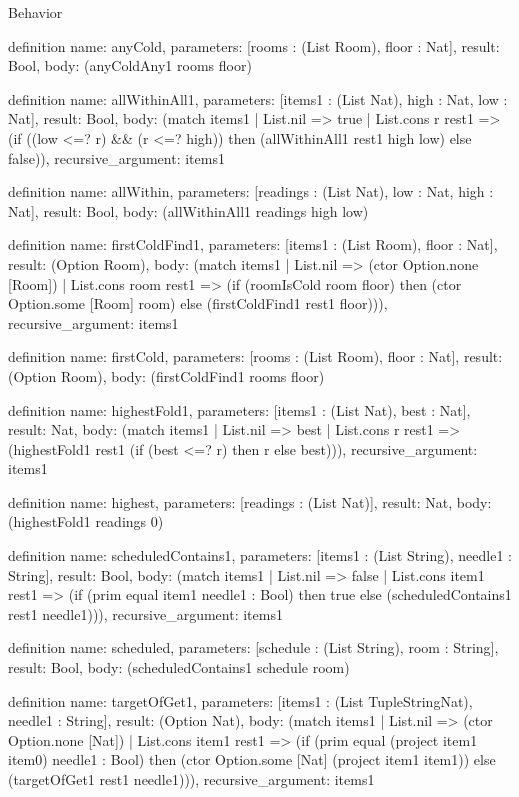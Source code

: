 \begin{lexlean}{Behavior}
\begin{semanticmodule}
definition{
  name: anyCold,
  parameters: [rooms : (List Room), floor : Nat],
  result: Bool,
  body: (anyColdAny1 rooms floor)
}

definition{
  name: allWithinAll1,
  parameters: [items1 : (List Nat), high : Nat, low : Nat],
  result: Bool,
  body: (match items1
    | List.nil => true
    | List.cons r rest1 => (if ((low <=? r) && (r <=? high)) then (allWithinAll1 rest1 high low) else false)),
  recursive_argument: items1
}

definition{
  name: allWithin,
  parameters: [readings : (List Nat), low : Nat, high : Nat],
  result: Bool,
  body: (allWithinAll1 readings high low)
}

definition{
  name: firstColdFind1,
  parameters: [items1 : (List Room), floor : Nat],
  result: (Option Room),
  body: (match items1
    | List.nil => (ctor Option.none [Room])
    | List.cons room rest1 => (if (roomIsCold room floor) then (ctor Option.some [Room] room) else (firstColdFind1 rest1 floor))),
  recursive_argument: items1
}

definition{
  name: firstCold,
  parameters: [rooms : (List Room), floor : Nat],
  result: (Option Room),
  body: (firstColdFind1 rooms floor)
}

definition{
  name: highestFold1,
  parameters: [items1 : (List Nat), best : Nat],
  result: Nat,
  body: (match items1
    | List.nil => best
    | List.cons r rest1 => (highestFold1 rest1 (if (best <=? r) then r else best))),
  recursive_argument: items1
}

definition{
  name: highest,
  parameters: [readings : (List Nat)],
  result: Nat,
  body: (highestFold1 readings 0)
}

definition{
  name: scheduledContains1,
  parameters: [items1 : (List String), needle1 : String],
  result: Bool,
  body: (match items1
    | List.nil => false
    | List.cons item1 rest1 => (if (prim equal item1 needle1 : Bool) then true else (scheduledContains1 rest1 needle1))),
  recursive_argument: items1
}

definition{
  name: scheduled,
  parameters: [schedule : (List String), room : String],
  result: Bool,
  body: (scheduledContains1 schedule room)
}

definition{
  name: targetOfGet1,
  parameters: [items1 : (List TupleStringNat), needle1 : String],
  result: (Option Nat),
  body: (match items1
    | List.nil => (ctor Option.none [Nat])
    | List.cons item1 rest1 => (if (prim equal (project item1 item0) needle1 : Bool) then (ctor Option.some [Nat] (project item1 item1)) else (targetOfGet1 rest1 needle1))),
  recursive_argument: items1
}


\end{semanticmodule}
\end{lexlean}
